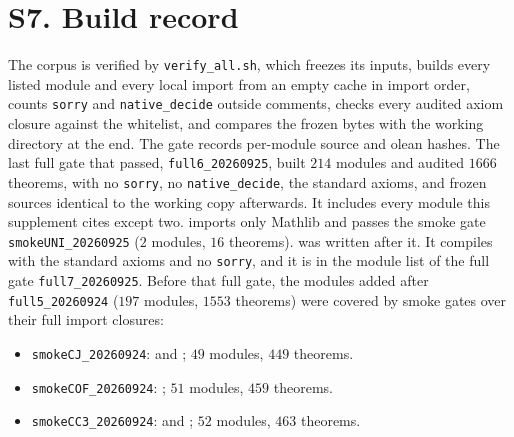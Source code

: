 \section{S7. Build record}

The corpus is verified by \texttt{verify\_all.sh}, which freezes its inputs, builds every
listed module and every local import from an empty cache in import order, counts
\texttt{sorry} and \texttt{native\_decide} outside comments, checks every audited axiom
closure against the whitelist, and compares the frozen bytes with the working directory at
the end. The gate records per-module source and olean hashes. The last full gate that passed,
\texttt{full6\_20260925}, built $214$ modules and audited $1666$ theorems, with no
\texttt{sorry}, no \texttt{native\_decide}, the standard axioms, and frozen sources identical to
the working copy afterwards. It includes every module this supplement cites except two.
 imports only Mathlib and passes the smoke gate
\texttt{smokeUNI\_20260925} ($2$ modules, $16$ theorems).  was
written after it. It compiles with the standard axioms and no \texttt{sorry}, and it is in the
module list of the full gate \texttt{full7\_20260925}. Before that full gate, the modules
added after \texttt{full5\_20260924} ($197$ modules, $1553$ theorems) were covered by smoke gates
over their full import closures:
\begin{itemize}
\item \texttt{smokeCJ\_20260924}:  and
; $49$ modules, $449$ theorems.
\item \texttt{smokeCOF\_20260924}: ; $51$ modules, $459$
theorems.
\item \texttt{smokeCC3\_20260924}:  and
; $52$ modules, $463$ theorems.
\end{itemize}


